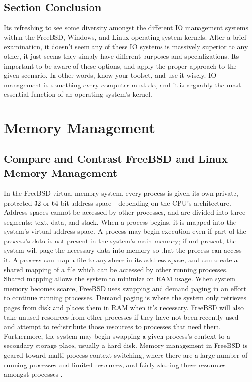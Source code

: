 \documentclass[onecolumn, draftclsnofoot,10pt, compsoc]{IEEEtran}
\begin{document}
\subsection{Section Conclusion}
\noindent Its refreshing to see some diversity amongst the different IO management systems within the FreeBSD, Windows, and Linux operating system kernels. After a brief examination, it doesn’t seem any of these IO systems is massively superior to any other, it just seems they simply have different purposes and specializations. Its important to be aware of these options, and apply the proper approach to the given scenario. In other words, know your toolset, and use it wisely. IO management is something every computer must do, and it is arguably the most essential function of an operating system’s kernel.

\newpage
\section{Memory Management}

\subsection{Compare and Contrast FreeBSD and Linux Memory Management}
\noindent In the FreeBSD virtual memory system, every process is given its own private, protected 32 or 64-bit address space–--depending on the CPU’s architecture. Address spaces cannot be accessed by other processes, and are divided into three segments: text, data, and stack. When a process begins, it is mapped into the system’s virtual address space. A process may begin execution even if part of the process’s data is not present in the system’s main memory; if not present, the system will page the necessary data into memory so that the process can access it. A process can map a file to anywhere in its address space, and can create a shared mapping of a file which can be accessed by other running processes. Shared mapping allows the system to minimize on RAM usage. When system memory becomes scarce, FreeBSD uses swapping and demand paging in an effort to continue running processes. Demand paging is where the system only retrieves pages from disk and places them in RAM when it’s necessary. FreeBSD will also take unused resources from other processes if they have not been recently used and attempt to redistribute those resources to processes that need them. Furthermore, the system may begin swapping a given process’s context to a secondary storage place, usually a hard disk. Memory management in FreeBSD is geared toward multi-process context switching, where there are a large number of running processes and limited resources, and fairly sharing these resources amongst processes \cite{FreeBSD1Mem} \cite{FreeBSD2Mem}.\\
\end{document}
